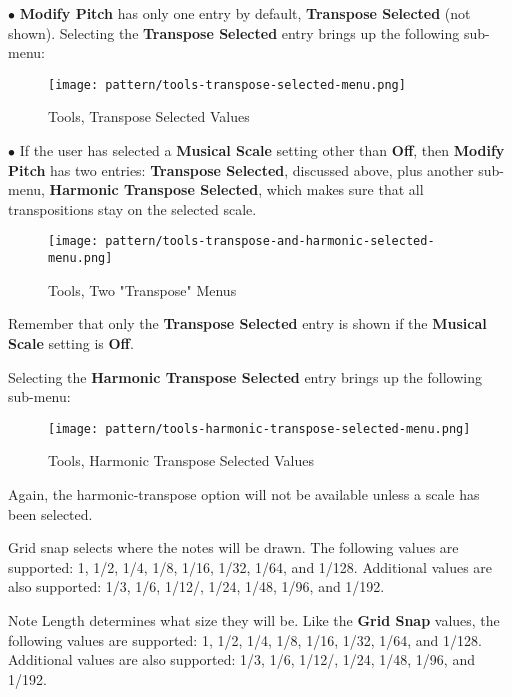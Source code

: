    $\bullet$ \textbf{Modify Pitch} has only one entry by default,
   \textbf{Transpose Selected} (not shown).
   Selecting the \textbf{Transpose Selected} entry
   brings up the following sub-menu:

\begin{figure}[H]
   \centering 
   \texttt{[image: pattern/tools-transpose-selected-menu.png]}
   \caption{Tools, Transpose Selected Values}
   \label{fig:pattern_editor_tools_transpose_selected_menu}
\end{figure}

   $\bullet$ If the user has selected a
   \textbf{Musical Scale} setting other than \textbf{Off},
   then \textbf{Modify Pitch} has two entries:
   \textbf{Transpose Selected}, discussed above, plus
   another sub-menu,
   \textbf{Harmonic Transpose Selected}, which makes sure that all
   transpositions stay on the selected scale.

\begin{figure}[H]
   \centering 
   \texttt{[image: pattern/tools-transpose-and-harmonic-selected-menu.png]}
   \caption{Tools, Two "Transpose" Menus}
   \label{fig:pattern_editor_tools_two_transpose_menus}
\end{figure}

   Remember that only the \textbf{Transpose Selected} entry is shown if the
   \textbf{Musical Scale} setting is \textbf{Off}.

   Selecting the \textbf{Harmonic Transpose Selected} entry brings up the
   following sub-menu:

\begin{figure}[H]
   \centering 
   \texttt{[image: pattern/tools-harmonic-transpose-selected-menu.png]}
   \caption{Tools, Harmonic Transpose Selected Values}
   \label{fig:pattern_editor_tools_harmonic_transpose_menu}
\end{figure}

   Again, the harmonic-transpose option will not be available unless a scale
   has been selected.

   Grid snap selects where the notes will be drawn.
   The following values are supported:
   1, 1/2, 1/4, 1/8, 1/16, 1/32, 1/64, and 1/128.
   Additional values are also supported:
   1/3, 1/6, 1/12/, 1/24, 1/48, 1/96, and 1/192.

   Note Length determines what size they will be.
   Like the \textbf{Grid Snap} values,
   the following values are supported:
   1, 1/2, 1/4, 1/8, 1/16, 1/32, 1/64, and 1/128.
   Additional values are also supported:
   1/3, 1/6, 1/12/, 1/24, 1/48, 1/96, and 1/192.

